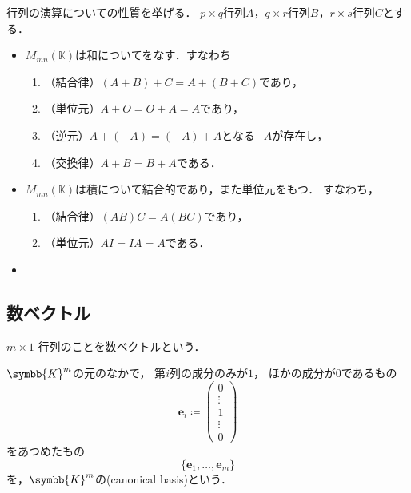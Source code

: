 \documentclass[../sotsu.tex]{subfiles}
\begin{document}
\begin{proposition}
    行列の演算についての性質を挙げる．
    $p \times q$行列$A$，$q \times r$行列$B$，$r \times s$行列$C$とする．
    \begin{itemize}
        \item $M_{mn}(𝕂)$は和についてをなす．すなわち
        \begin{enumerate}
            \item （結合律）$(A + B) + C = A + (B + C)$であり，
            \item （単位元）$A + O = O + A = A$であり，
            \item （逆元）$A + (-A) = (-A) + A$となる$-A$が存在し，
            \item （交換律）$A + B = B + A$である．
        \end{enumerate}
        \item $M_{mn}(𝕂)$は積について結合的であり，また単位元をもつ．
            すなわち，
        \begin{enumerate}
            \item （結合律）$(AB)C = A(BC)$であり，
            \item （単位元）$AI = IA = A$である．
        \end{enumerate}
        \item 
    \end{itemize}
\end{proposition}


\subsection{数ベクトル}

$m \times 1$-行列のことを数ベクトルという．

\begin{definition}
    \label{dfn:canonical-basis-of-coordinate-space}
    $\symbb{K}^m$の元のなかで，
    第$i$列の成分のみが$1$，
    ほかの成分が$0$であるもの
    \begin{equation*}
        \symbf{e}_i
            \coloneq
            \begin{pmatrix}
                0  \\  \vdots  \\  1  \\  \vdots  \\  0
            \end{pmatrix}
    \end{equation*}
    をあつめたもの
    \begin{equation*}
        \{  \symbf{e}_1, \dots, \symbf{e}_m  \}
    \end{equation*}
    を，$\symbb{K}^m$の(canonical basis)という．
\end{definition}
\end{document}

